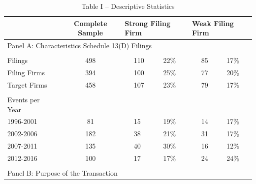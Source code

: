 \documentclass[12pt]{article}
\begin{document}
	\begin{adjustwidth}{-6in}{-1in}
		\begin{table}[htbp]
			\centering
			\caption{Table I -- Descriptive Statistics}
			\begin{tabular}{lcclccllccc}
			\toprule
					&       & \multicolumn{1}{p{6.835em}}{Complete
				Sample} & \multicolumn{4}{p{8em}}{Strong
				Filing Firm} & \multicolumn{4}{p{6.165em}}{Weak 
				Filing Firm} \\
			\midrule
			\multicolumn{11}{p{37.33em}}{Panel A: Characteristics Schedule 13(D) Filings} \\
			\midrule
					&       &       &       &       &       &       &       &       &       &  \\
			Filings &       & 498   &       & \multicolumn{1}{l}{110} & \multicolumn{1}{r}{22\%} &       &       & \multicolumn{1}{l}{85} & \multicolumn{1}{r}{17\%} &  \\
			Filing Firms &       & 394   &       & \multicolumn{1}{l}{100} & \multicolumn{1}{r}{25\%} &       &       & \multicolumn{1}{l}{77} & \multicolumn{1}{r}{20\%} &  \\
			Target Firms &       & 458   &       & \multicolumn{1}{l}{107} & \multicolumn{1}{r}{23\%} &       &       & \multicolumn{1}{l}{79} & \multicolumn{1}{r}{17\%} &  \\
					&       &       &       &       &       &       &       &       &       &  \\
			Events per Year &       &       &       &       &       &       &       &       &       &  \\
			1996-2001 &       & 81    &       & \multicolumn{1}{l}{15} & \multicolumn{1}{r}{19\%} &       &       & \multicolumn{1}{l}{14} & \multicolumn{1}{r}{17\%} &  \\
			2002-2006 &       & 182   &       & \multicolumn{1}{l}{38} & \multicolumn{1}{r}{21\%} &       &       & \multicolumn{1}{l}{31} & \multicolumn{1}{r}{17\%} &  \\
			2007-2011 &       & 135   &       & \multicolumn{1}{l}{40} & \multicolumn{1}{r}{30\%} &       &       & \multicolumn{1}{l}{16} & \multicolumn{1}{r}{12\%} &  \\
			2012-2016 &       & 100   &       & \multicolumn{1}{l}{17} & \multicolumn{1}{r}{17\%} &       &       & \multicolumn{1}{l}{24} & \multicolumn{1}{r}{24\%} &  \\
					&       &       &       &       &       &       &       &       &       &  \\
			\midrule
			\multicolumn{11}{p{37.33em}}{Panel B: Purpose of the Transaction} \\

\end{tabular}
\end{table}
\end{adjustwidth}
\end{document}
